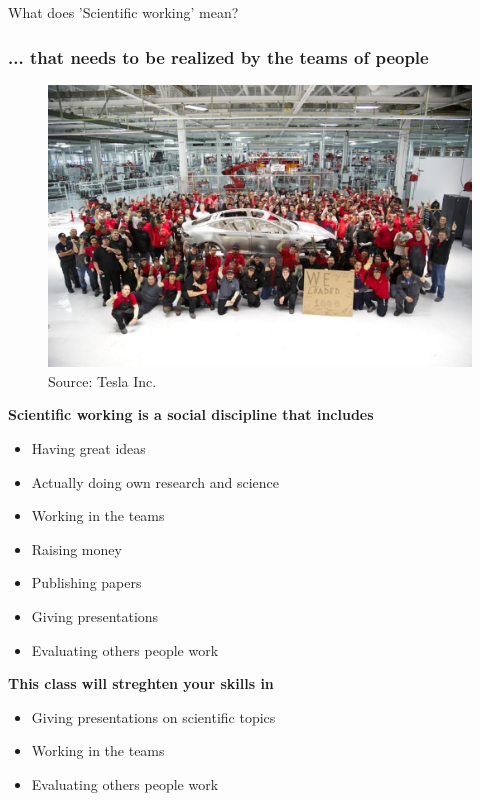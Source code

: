 \begin{frame}{What does 'Scientific working' mean?}
\frametitle{... that needs to be realized by the teams of people}
\begin{figure}
 \includegraphics[width=\linewidth]{img/teslateam.eps}
\caption{Source: Tesla Inc.}
\end{figure}
\end{frame}

\begin{frame}
\textbf{Scientific working is a social discipline that includes}
\begin{itemize}
\item Having great ideas
\item Actually doing own research and science
\item Working in the teams
\item Raising money
\item Publishing papers
\item Giving presentations
\item Evaluating others people work
\end{itemize}
\textbf{This class will streghten your skills in}
\begin{itemize}
\item Giving presentations on scientific topics
\item Working in the teams
\item Evaluating others people work
\end{itemize}
\end{frame}

